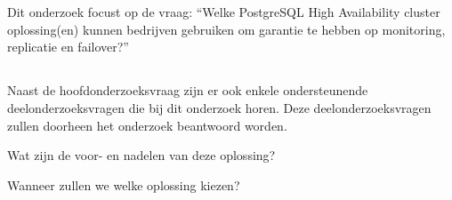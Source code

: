 
\section{}
\label{sec:onderzoeksvraag}

\subsection{}
\label{subsec:Hoofdonderzoeksvraag}

Dit onderzoek focust op de vraag: “Welke PostgreSQL High Availability cluster oplossing(en) kunnen bedrijven gebruiken om garantie te hebben op monitoring, replicatie en failover?”

\subsection{}
\label{subsec:Deelonderzoeksvraag}

Naast de hoofdonderzoeksvraag zijn er ook enkele ondersteunende deelonderzoeksvragen die bij dit onderzoek horen. Deze deelonderzoeksvragen zullen doorheen het onderzoek beantwoord worden. %

 \begin{description}
    \item
    \item[$\cdot$] Wat zijn de voor- en nadelen van deze oplossing?
    \item[$\cdot$] Wanneer zullen we welke oplossing kiezen?
\end{description}


